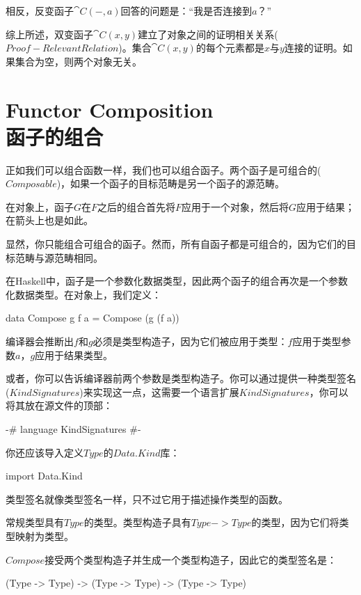 \documentclass[DaoFP]{subfiles}
\begin{document}
    相反，反变函子$\cat C (-, a)$回答的问题是：“我是否连接到$a$？”

    综上所述，双变函子$\cat C(x, y)$建立了对象之间的证明相关关系($Proof-Relevant Relation$)。集合$\cat C(x, y)$的每个元素都是$x$与$y$连接的证明。如果集合为空，则两个对象无关。

    \section{Functor Composition\\函子的组合}

    正如我们可以组合函数一样，我们也可以组合函子。两个函子是可组合的($Composable$)，如果一个函子的目标范畴是另一个函子的源范畴。

    在对象上，函子$G$在$F$之后的组合首先将$F$应用于一个对象，然后将$G$应用于结果；在箭头上也是如此。

    显然，你只能组合可组合的函子。然而，所有自函子都是可组合的，因为它们的目标范畴与源范畴相同。

    在Haskell中，函子是一个参数化数据类型，因此两个函子的组合再次是一个参数化数据类型。在对象上，我们定义：

    \begin{haskell}
        data Compose g f a = Compose (g (f a))
    \end{haskell}

    编译器会推断出$f$和$g$必须是类型构造子，因为它们被应用于类型：$f$应用于类型参数$a$，$g$应用于结果类型。

    或者，你可以告诉编译器前两个参数是类型构造子。你可以通过提供一种类型签名($Kind Signatures$)来实现这一点，这需要一个语言扩展$KindSignatures$，你可以将其放在源文件的顶部：

    \begin{haskell}
    {-# language KindSignatures #-}
    \end{haskell}

    你还应该导入定义$Type$的$Data.Kind$库：

    \begin{haskell}
        import Data.Kind
    \end{haskell}

    类型签名就像类型签名一样，只不过它用于描述操作类型的函数。

    常规类型具有$Type$的类型。类型构造子具有$Type -> Type$的类型，因为它们将类型映射为类型。

    $Compose$接受两个类型构造子并生成一个类型构造子，因此它的类型签名是：

    \begin{haskell}
    (Type -> Type) -> (Type -> Type) -> (Type -> Type)
    \end{haskell}
\end{document}
